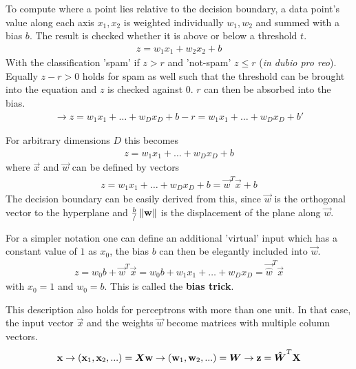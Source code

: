 To compute where a point lies relative to the decision boundary, a data point's value along each axis $x_1, x_2$ is weighted individually $w_1, w_2$ and summed with a bias $b$.
The result is checked whether it is above or below a threshold $t$.
\begin{align}
    z = w_1 x_1 + w_2 x_2 + b
\end{align}
With the classification 'spam' if $z > r$ and 'not-spam' $z \leq r$ (\textit{in dubio pro reo}).
Equally $z - r > 0$ holds for spam as well such that the threshold can be brought into the equation and $z$ is checked against $0$.
$r$ can then be absorbed into the bias.
\begin{align}
    \rightarrow z = w_1 x_1 + \hdots + w_D x_D + b - r = w_1 x_1 + \hdots + w_D x_D + b'
\end{align}

For arbitrary dimensions $D$ this becomes
\begin{align}
    z = w_1 x_1 + \hdots + w_D x_D + b
\end{align}
 where $\vec{x}$ and $\vec{w}$ can be defined by vectors
\begin{align}
    z = w_1 x_1 + \hdots + w_D x_D + b = \vec{w}^T \vec{x} + b
\end{align}
The decision boundary can be easily derived from this, since $\vec{w}$ is the orthogonal vector to the hyperplane and $\frac{b}/\left\lVert\mathbf{w}\right\rVert$ is the displacement of the plane along $\vec{w}$.

For a simpler notation one can define an additional 'virtual' input which has a constant value of $1$ as $x_0$, the bias $b$ can then be elegantly included into $\vec{w}$.
\begin{align}
    z = w_0 b + \vec{w}^T \vec{x} = w_0 b + w_1 x_1 + \hdots + w_D x_D = \vec{\hat{w}}^T \vec{x}
\end{align}
with $x_0 = 1$ and $w_0 = b$.
This is called the \textbf{bias trick}.

This description also holds for perceptrons with more than one unit.
In that case, the input vector $\vec{x}$ and the weights $\vec{w}$ become matrices with multiple column vectors.
\begin{align}
    \mathbf{x} \rightarrow (\mathbf{x}_1, \mathbf{x}_2, ...) = \boldsymbol{X}
    \mathbf{w} \rightarrow (\mathbf{w}_1, \mathbf{w}_2, ...) = \boldsymbol{W}
    \rightarrow \mathbf{z} = \boldsymbol{\hat{W}}^T \mathbf{X}
\end{align}


